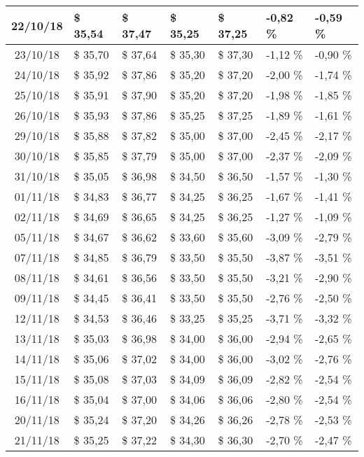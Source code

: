 \begin{center}
\begin{longtable}{|c|p{1.5cm}|p{1.5cm}|p{1.5cm}|p{1.5cm}|p{1.5cm}|p{1.5cm}|}
22/10/18 & \$ 35,54 & \$ 37,47 & \$ 35,25 & \$ 37,25 & -0,82 \% & -0,59 \% \\ \hline
23/10/18 & \$ 35,70 & \$ 37,64 & \$ 35,30 & \$ 37,30 & -1,12 \% & -0,90 \% \\ \hline
24/10/18 & \$ 35,92 & \$ 37,86 & \$ 35,20 & \$ 37,20 & -2,00 \% & -1,74 \% \\ \hline
25/10/18 & \$ 35,91 & \$ 37,90 & \$ 35,20 & \$ 37,20 & -1,98 \% & -1,85 \% \\ \hline
26/10/18 & \$ 35,93 & \$ 37,86 & \$ 35,25 & \$ 37,25 & -1,89 \% & -1,61 \% \\ \hline
29/10/18 & \$ 35,88 & \$ 37,82 & \$ 35,00 & \$ 37,00 & -2,45 \% & -2,17 \% \\ \hline
30/10/18 & \$ 35,85 & \$ 37,79 & \$ 35,00 & \$ 37,00 & -2,37 \% & -2,09 \% \\ \hline
31/10/18 & \$ 35,05 & \$ 36,98 & \$ 34,50 & \$ 36,50 & -1,57 \% & -1,30 \% \\ \hline
01/11/18 & \$ 34,83 & \$ 36,77 & \$ 34,25 & \$ 36,25 & -1,67 \% & -1,41 \% \\ \hline
02/11/18 & \$ 34,69 & \$ 36,65 & \$ 34,25 & \$ 36,25 & -1,27 \% & -1,09 \% \\ \hline
05/11/18 & \$ 34,67 & \$ 36,62 & \$ 33,60 & \$ 35,60 & -3,09 \% & -2,79 \% \\ \hline
07/11/18 & \$ 34,85 & \$ 36,79 & \$ 33,50 & \$ 35,50 & -3,87 \% & -3,51 \% \\ \hline
08/11/18 & \$ 34,61 & \$ 36,56 & \$ 33,50 & \$ 35,50 & -3,21 \% & -2,90 \% \\ \hline
09/11/18 & \$ 34,45 & \$ 36,41 & \$ 33,50 & \$ 35,50 & -2,76 \% & -2,50 \% \\ \hline
12/11/18 & \$ 34,53 & \$ 36,46 & \$ 33,25 & \$ 35,25 & -3,71 \% & -3,32 \% \\ \hline
13/11/18 & \$ 35,03 & \$ 36,98 & \$ 34,00 & \$ 36,00 & -2,94 \% & -2,65 \% \\ \hline
14/11/18 & \$ 35,06 & \$ 37,02 & \$ 34,00 & \$ 36,00 & -3,02 \% & -2,76 \% \\ \hline
15/11/18 & \$ 35,08 & \$ 37,03 & \$ 34,09 & \$ 36,09 & -2,82 \% & -2,54 \% \\ \hline
16/11/18 & \$ 35,04 & \$ 37,00 & \$ 34,06 & \$ 36,06 & -2,80 \% & -2,54 \% \\ \hline
20/11/18 & \$ 35,24 & \$ 37,20 & \$ 34,26 & \$ 36,26 & -2,78 \% & -2,53 \% \\ \hline
21/11/18 & \$ 35,25 & \$ 37,22 & \$ 34,30 & \$ 36,30 & -2,70 \% & -2,47 \% \\ \hline

\end{longtable}
\end{center}

